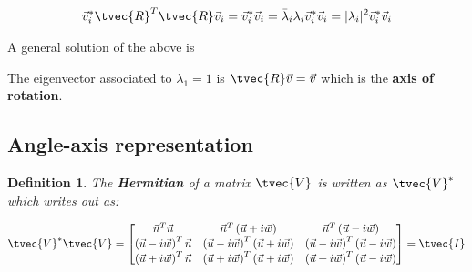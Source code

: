 \documentclass[10pt,a4paper]{scrartcl}
\newtheorem{define}{Definition}
\begin{document}
\begin{multicols*}{2}
\begin{align*}
\vec{v}_i^\ast\tvec{R}^T\tvec{R}\vec{v}_i=\vec{v}_i^\ast\vec{v}_i=\bar{\lambda}_i\lambda_i\vec{v}_i^\ast\vec{v}_i=|\lambda_i|^2\vec{v}_i^\ast\vec{v}_i
\end{align*}



A general solution of the above is


The eigenvector associated to $\lambda_1=1$ is $\tvec{R}\vec{v}=\vec{v}$ which is the \textbf{axis of rotation}.

\subsection{Angle-axis representation}


\begin{define}
The \textbf{Hermitian} of a matrix $\tvec{V}$ is written as $\tvec{V}^\ast$ which writes out as:

\end{define}


\begin{align*}
\tvec{V}^\ast\tvec{V}=\begin{bmatrix}
\vec{n}^T\vec{n}&\vec{n}^T\left(\vec{u}+i\vec{w}\right)&\vec{n}^T\left(\vec{u}-i\vec{w}\right)\\
\left(\vec{u}-i\vec{w}\right)^T\vec{n}&\left(\vec{u}-i\vec{w}\right)^T\left(\vec{u}+i\vec{w}\right)&\left(\vec{u}-i\vec{w}\right)^T\left(\vec{u}-i\vec{w}\right)\\
\left(\vec{u}+i\vec{w}\right)^T\vec{n}&\left(\vec{u}+i\vec{w}\right)^T\left(\vec{u}+i\vec{w}\right)&\left(\vec{u}+i\vec{w}\right)^T\left(\vec{u}-i\vec{w}\right)
\end{bmatrix}=\tvec{I}
\end{align*}


\end{multicols*}
\end{document}

